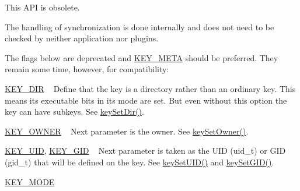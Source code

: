 \begin{DoxyRefList}
%
This A\+PI is obsolete. 
\item[Member \mbox{\hyperlink{group__keytest_gaf247df0de7aca04b32ef80e39ef12950}{key\+Need\+Sync}} (const \mbox{\hyperlink{classkdb_1_1Key}{Key}} $\ast$key)]\label{deprecated__deprecated000012}%
%
The handling of synchronization is done internally and does not need to be checked by neither application nor plugins. 
\item[Member \mbox{\hyperlink{group__key_gad23c65b44bf48d773759e1f9a4d43b89}{key\+New}} (const char $\ast$name,...)]\label{deprecated__deprecated000010}%
%
The flags below are deprecated and \mbox{\hyperlink{group__key_gga91fb3178848bd682000958089abbaf40a040582834bb2d90049947d7ef74e87e2}{K\+E\+Y\+\_\+\+M\+E\+TA}} should be preferred. They remain some time, however, for compatibility\+:
\begin{DoxyItemize}
\item \mbox{\hyperlink{group__key_gga91fb3178848bd682000958089abbaf40a9e43e47c8a21478538e2d20e049981d5}{K\+E\+Y\+\_\+\+D\+IR}} ~\newline
 Define that the key is a directory rather than an ordinary key. This means its executable bits in its mode are set. But even without this option the key can have subkeys. See \mbox{\hyperlink{group__meta_gaae575bd86a628a15ee45baa860522e75}{key\+Set\+Dir()}}.
\item \mbox{\hyperlink{group__key_gga91fb3178848bd682000958089abbaf40a77ca60362fa8daca8d5347db4385068b}{K\+E\+Y\+\_\+\+O\+W\+N\+ER}} ~\newline
 Next parameter is the owner. See \mbox{\hyperlink{owner_8c_a88d6ec200ba0707b7c1b4a88133d2be4}{key\+Set\+Owner()}}.
\item \mbox{\hyperlink{group__key_gga91fb3178848bd682000958089abbaf40a28f01a87d65f065172f734c9c9446c0e}{K\+E\+Y\+\_\+\+U\+ID}}, \mbox{\hyperlink{group__key_gga91fb3178848bd682000958089abbaf40ac0628bbaba7c837ca73323681393d15f}{K\+E\+Y\+\_\+\+G\+ID}} ~\newline
 Next parameter is taken as the U\+ID (uid\+\_\+t) or G\+ID (gid\+\_\+t) that will be defined on the key. See \mbox{\hyperlink{group__meta_gab5f284f5ecd261e0a290095f50ba1af7}{key\+Set\+U\+I\+D()}} and \mbox{\hyperlink{group__meta_ga9e3d0fb3f7ba906e067727b9155d22e3}{key\+Set\+G\+I\+D()}}.
\item \mbox{\hyperlink{group__key_gga91fb3178848bd682000958089abbaf40a1b0a91ff3a855d6993930ebf0abaa518}{K\+E\+Y\+\_\+\+M\+O\+DE}} ~\newline

\end{DoxyItemize}
\end{DoxyRefList}

